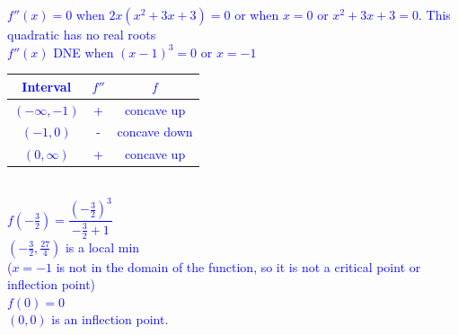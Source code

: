 \documentclass{ximera}
\begin{document}
\begin{exercise}
\begin{enumerate}
    
    \textcolor{blue}{
    $f''(x)=0$ when $2x(x^2+3x+3)=0$ or when $x=0$ or $x^2+3x+3=0$.  This quadratic has no real roots\\
    $f''(x)$ DNE when $(x-1)^3=0$ or $x=-1$\\
    \begin{tabular}{c|c|c}
        Interval &  $f''$ & $f$ \\ \hline
        $(-\infty, -1)$ & + & concave up\\
        $(-1,0)$ & - & concave down\\
        $(0,\infty)$ & + & concave up
    \end{tabular}}
    \\
    \textcolor{blue}{
    $f(-\frac32)=\dfrac{(-\frac32)^3}{-\frac32+1}$\\
    $(-\frac32, \frac{27}{4})$ is a local min\\
    ($x=-1$ is not in the domain of the function, so it is not a critical point or inflection point) \\
    $f(0)=0$\\
    $(0,0)$ is an inflection point.\\}
     \begin{image} 
    \end{image}
    
    
\end{enumerate}
\end{exercise}
\end{document}
